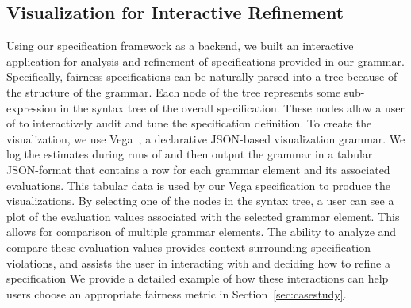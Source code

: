 
\subsection{Visualization for Interactive Refinement}
Using our specification framework as a backend, we built an interactive application for analysis and refinement of specifications provided in our grammar.
Specifically, fairness specifications can be naturally parsed into a tree because of the structure of the grammar.
Each node of the tree represents some sub-expression in the syntax tree of the overall specification.
These nodes allow a user of \AVOIRmethodname{} to interactively audit and tune the specification definition.
To create the visualization, we use Vega~\citep{satyanarayan2015reactive}, a declarative JSON-based visualization grammar.
We log the estimates during runs of \AVOIRmethodname{} and then output the grammar in a tabular JSON-format that contains a row for each grammar element and its associated evaluations.
This tabular data is used by our Vega specification to produce the visualizations.
By selecting one of the nodes in the syntax tree, a user can see a plot of the evaluation values associated with the selected grammar element.
This allows for comparison of multiple grammar elements.
The ability to analyze and compare these evaluation values provides context surrounding specification violations, and assists the user in interacting with and deciding how to refine a specification
We provide a detailed example of how these interactions can help \AVOIRmethodname{} users choose an appropriate fairness metric in Section~\ref{sec:casestudy}.
